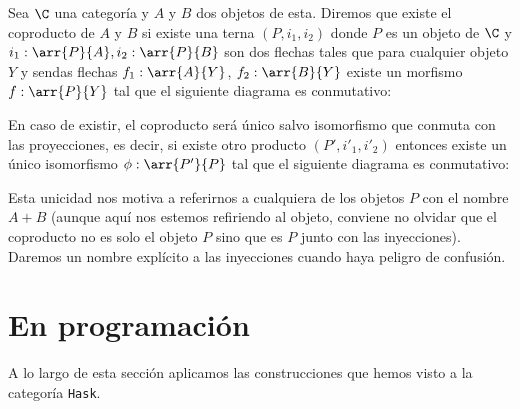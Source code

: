 \begin{definition}
Sea $\C$ una categoría y $A$ y $B$ dos objetos de esta. Diremos que
existe el coproducto de $A$ y $B$
si existe una terna $(P, i_1, i_2)$
donde $P$ es un objeto de $\C$ y
$i_1 : \arr{P}{A}, i_2 : \arr{P}{B}$ son dos flechas tales
que para cualquier objeto $Y$ y sendas flechas $f_1 : \arr{A}{Y}$,
$f_2 : \arr{B}{Y}$ existe un morfismo
$f : \arr{P}{Y}$ tal que el siguiente diagrama es conmutativo:
\begin{center}

\end{center}

En caso de existir, el coproducto será único salvo isomorfismo
que conmuta con las proyecciones, es decir, si existe otro
producto $(P', i'_1, i'_2)$ entonces
existe un único isomorfismo $\phi : \arr{P'}{P}$ tal que
el siguiente diagrama
es conmutativo:
\begin{center}
\end{center}

Esta unicidad nos motiva a referirnos a cualquiera de los objetos
$P$ con el nombre $A+B$ (aunque aquí nos estemos refiriendo
al objeto, conviene no olvidar que el coproducto no es solo el objeto
$P$ sino que es $P$ junto con las inyecciones). Daremos un nombre
explícito a las inyecciones cuando haya peligro de confusión.
\end{definition}

\section{En programación}
A lo largo de esta sección aplicamos las construcciones que hemos visto
a la categoría \texttt{Hask}.

